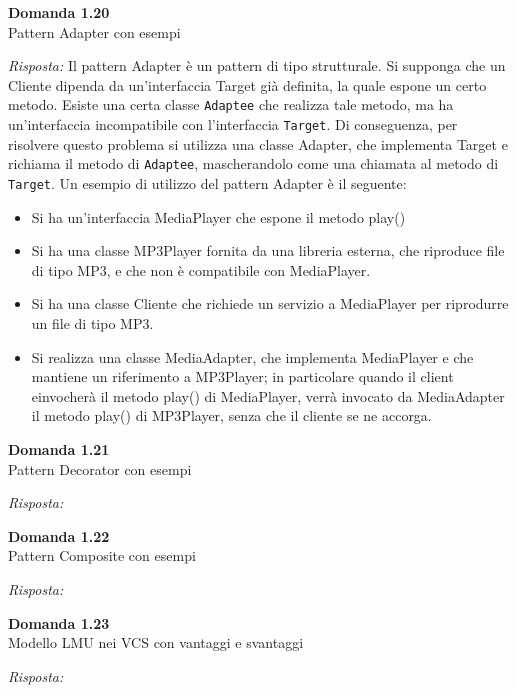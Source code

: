 \documentclass{article}
\newenvironment{problem}[2][Domanda]
    { \begin{mdframed}[backgroundcolor=gray!20] \textbf{#1 #2} \\}
    {  \end{mdframed}}
\newenvironment{solution}
    {\textit{Risposta:}}
    {}
\begin{document}
\begin{problem}{1.20}
Pattern Adapter con esempi
\end{problem}
\begin{solution}
Il pattern Adapter è un pattern di tipo strutturale.
Si supponga che un Cliente dipenda da un'interfaccia Target già definita, la quale espone un certo metodo.
Esiste una certa classe \texttt{Adaptee} che realizza tale metodo, ma ha un'interfaccia incompatibile con l'interfaccia \texttt{Target}.
Di conseguenza, per risolvere questo problema si utilizza una classe Adapter, che implementa Target e richiama il metodo di \texttt{Adaptee}, mascherandolo come una chiamata al metodo di \texttt{Target}.
Un esempio di utilizzo del pattern Adapter è il seguente:
\begin{itemize}
	\item Si ha un'interfaccia MediaPlayer che espone il metodo play()
	\item Si ha una classe MP3Player fornita da una libreria esterna, che riproduce file di tipo MP3, e che non è compatibile con MediaPlayer.
	\item Si ha una classe Cliente che richiede un servizio a MediaPlayer per riprodurre un file di tipo MP3.
	\item Si realizza una classe MediaAdapter, che implementa MediaPlayer e che mantiene un riferimento a MP3Player; in particolare quando il client einvocherà il metodo play() di MediaPlayer, verrà invocato da MediaAdapter il metodo play() di MP3Player, senza che il cliente se ne accorga.

\end{itemize}
\end{solution}

\begin{problem}{1.21}
Pattern Decorator con esempi
\end{problem}
\begin{solution}

\end{solution}

\begin{problem}{1.22}
Pattern Composite con esempi
\end{problem}
\begin{solution}
\end{solution}

\begin{problem}{1.23}
Modello LMU nei VCS con vantaggi e svantaggi
\end{problem}
\begin{solution}
\end{solution}
\newpage
\end{document}
